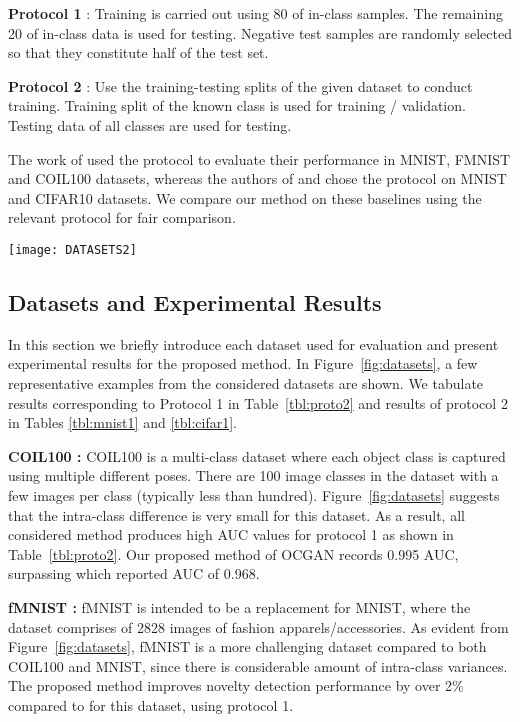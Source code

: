 \documentclass[10pt,twocolumn,letterpaper]{article}
\begin{document}
\noindent \textbf{Protocol 1} : Training is carried out using 80 of in-class samples. The remaining 20 of in-class data is used for testing. Negative test samples are randomly selected so that they constitute half of the test set.


\noindent \textbf{Protocol 2} : Use the training-testing splits of the given dataset to conduct training. Training split of the known class is used for training / validation. Testing data of all classes are used for testing.

The work of 
\cite{GPND} used the  protocol to evaluate their performance in MNIST\cite{MNIST}, FMNIST\cite{fmnist} and COIL100\cite{COIL} datasets, whereas the authors of \cite{AND} and \cite{dsvdd} chose the  protocol on MNIST and CIFAR10\cite{CIFAR} datasets. We compare our method on these baselines using the relevant protocol for fair comparison.


\begin{figure*}
    \centering
\texttt{[image: DATASETS2]}\hskip30pt
    \caption{Representative images from the datasets used for evaluation. Images in each column belong to the same class. }
    \label{fig:datasets}
\end{figure*}

\subsection{Datasets and Experimental Results}
In this section we briefly introduce each dataset used for evaluation and present experimental results for the proposed method. In Figure~\ref{fig:datasets}, a few representative examples from the considered datasets are shown. We tabulate results corresponding to Protocol 1 in Table~\ref{tbl:proto2}
 and results of protocol 2 in Tables \ref{tbl:mnist1} and \ref{tbl:cifar1}. 
 
\noindent  \textbf{COIL100 :} COIL100 is a multi-class dataset where each object class is captured using multiple different poses. There are 100 image classes in the dataset with a few images per class (typically less than hundred). Figure~\ref{fig:datasets} suggests that the intra-class difference is very small for this dataset. As a result, all considered method produces high AUC values for protocol 1 as shown in Table~\ref{tbl:proto2}. Our proposed method of OCGAN records 0.995 AUC, surpassing \cite{GPND} which reported AUC of 0.968.


\noindent  \textbf{fMNIST :} fMNIST is intended to be a replacement for MNIST, where the dataset comprises of 2828 images of fashion apparels/accessories. As evident from  Figure~\ref{fig:datasets}, fMNIST is a more challenging dataset compared to both COIL100 and MNIST, since there is considerable amount of intra-class variances.  The proposed method improves novelty detection performance by over 2\% compared to \cite{GPND} for this dataset, using protocol 1.
\end{document}
